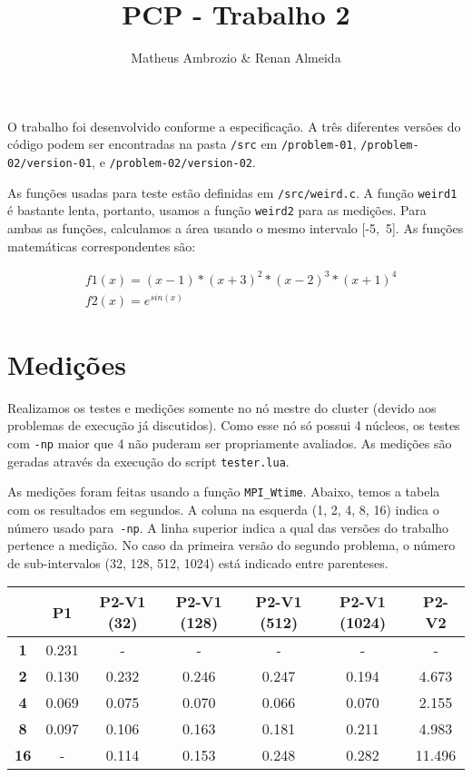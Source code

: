 \documentclass[12pt]{article}
\def\code#1{\texttt{#1}}
\begin{document}
 
\title{PCP - Trabalho 2}
\author{Matheus Ambrozio \& Renan Almeida}
 
\maketitle

O trabalho foi desenvolvido conforme a especificação. A três diferentes versões do código podem ser encontradas na pasta \code{/src} em \code{/problem-01}, \code{/problem-02/version-01}, e \code{/problem-02/version-02}.

As funções usadas para teste estão definidas em \code{/src/weird.c}. A função \code{weird1} é bastante lenta, portanto, usamos a função \code{weird2} para as medições. Para ambas as funções, calculamos a área usando o mesmo intervalo [-5,~5]. As funções matemáticas correspondentes são:

\begin{align}
& f1(x) = (x - 1) * (x + 3)^2 * (x - 2)^3 * (x + 1)^4 \\
& f2(x) = e^{sin(x)}
\end{align}

\section*{Medições}

Realizamos os testes e medições somente no nó mestre do cluster (devido aos problemas de execução já discutidos). Como esse nó só possui 4 núcleos, os testes com \code{-np} maior que 4 não puderam ser propriamente avaliados. As medições são geradas através da execução do script \code{tester.lua}.

As medições foram feitas usando a função \code{MPI\_Wtime}. Abaixo, temos a tabela com os resultados em segundos. A coluna na esquerda (1, 2, 4, 8, 16) indica o número usado para~\code{-np}. A linha superior indica a qual das versões do trabalho pertence a medição. No caso da primeira versão do segundo problema, o número de sub-intervalos (32, 128, 512, 1024) está indicado entre parenteses.

\begin{table}[h]
\begin{tabular}{|c|c|c|c|c|c|c|}
\hline
    { }                     &
    {\textbf{P1}}           &
    {\textbf{P2-V1 (32)}}   &
    {\textbf{P2-V1 (128)}}  &
    {\textbf{P2-V1 (512)}}  &
    {\textbf{P2-V1 (1024)}} &
    {\textbf{P2-V2}}        \\
\hline
{\textbf{1}}  & 0.231   & -     & -     & -     & -     & -      \\ \hline
{\textbf{2}}  & 0.130   & 0.232 & 0.246 & 0.247 & 0.194 & 4.673  \\ \hline
{\textbf{4}}  & 0.069   & 0.075 & 0.070 & 0.066 & 0.070 & 2.155  \\ \hline
{\textbf{8}}  & 0.097   & 0.106 & 0.163 & 0.181 & 0.211 & 4.983  \\ \hline
{\textbf{16}} & -       & 0.114 & 0.153 & 0.248 & 0.282 & 11.496 \\ \hline
\end{tabular}
\end{table}
\end{document}
